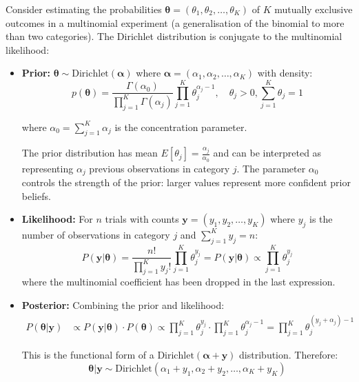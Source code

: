 \begin{examplebox}
\begin{example}

Consider estimating the probabilities $\boldsymbol{\theta} = (\theta_1, \theta_2, \dots, \theta_K)$ of $K$ mutually exclusive outcomes in a multinomial experiment (a generalisation of the binomial to more than two categories). The Dirichlet distribution is conjugate to the multinomial likelihood:

\begin{itemize}
\item \textbf{Prior:} $\boldsymbol{\theta} \sim \text{Dirichlet}(\boldsymbol{\alpha})$ where $\boldsymbol{\alpha} = (\alpha_1, \alpha_2, \dots, \alpha_K)$ with density:
$$p(\boldsymbol{\theta}) = \frac{\Gamma(\alpha_0)}{\prod_{j=1}^K \Gamma(\alpha_j)} \prod_{j=1}^K \theta_j^{\alpha_j-1}, \quad \theta_j > 0, \sum_{j=1}^K \theta_j = 1$$

where $\alpha_0 = \sum_{j=1}^K \alpha_j$ is the concentration parameter.

The prior distribution has mean $E[\theta_j] = \frac{\alpha_j}{\alpha_0}$ and can be interpreted as representing $\alpha_j$ previous observations in category $j$. The parameter $\alpha_0$ controls the strength of the prior: larger values represent more confident prior beliefs.

\item \textbf{Likelihood:} For $n$ trials with counts $\mathbf{y} = (y_1, y_2, \dots, y_K)$ where $y_j$ is the number of observations in category $j$ and $\sum_{j=1}^K y_j = n$:
$$P(\mathbf{y}|\boldsymbol{\theta}) = \frac{n!}{\prod_{j=1}^K y_j!} \prod_{j=1}^K \theta_j^{y_j} =  P(\mathbf{y}|\boldsymbol{\theta}) \propto \prod_{j=1}^K \theta_j^{y_j}$$
where the multinomial coefficient has been dropped in the last expression.

\item \textbf{Posterior:} Combining the prior and likelihood:
\begin{align*}
P(\boldsymbol{\theta}|\mathbf{y}) &\propto P(\mathbf{y}|\boldsymbol{\theta}) \cdot P(\boldsymbol{\theta}) \propto \prod_{j=1}^K \theta_j^{y_j} \cdot \prod_{j=1}^K \theta_j^{\alpha_j-1} = \prod_{j=1}^K \theta_j^{(y_j+\alpha_j)-1}
\end{align*}

This is the functional form of a $\text{Dirichlet}(\boldsymbol{\alpha} + \mathbf{y})$ distribution. Therefore:
$$\boldsymbol{\theta}|\mathbf{y} \sim \text{Dirichlet}(\alpha_1 + y_1, \alpha_2 + y_2, \dots, \alpha_K + y_K)$$
\end{itemize}


\end{example}
\end{examplebox}
